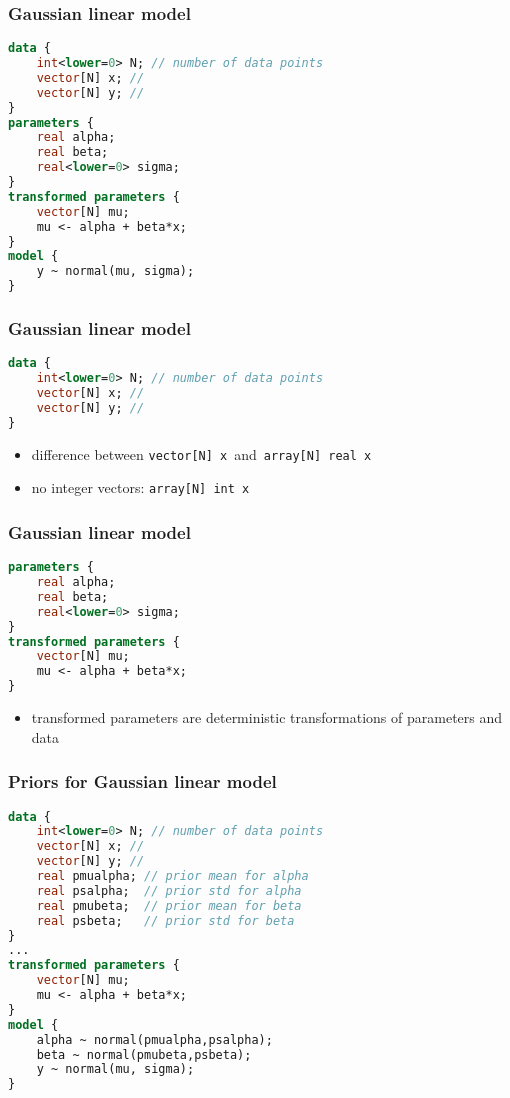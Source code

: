 \documentclass[finnish,english,t]{beamer}
\begin{document}
\begin{frame}[fragile]
  \frametitle{Gaussian linear model}
  {\small
  \begin{lstlisting}[language=Stan]
data {
    int<lower=0> N; // number of data points 
    vector[N] x; // 
    vector[N] y; // 
}
parameters {
    real alpha; 
    real beta; 
    real<lower=0> sigma;
}
transformed parameters {
    vector[N] mu;
    mu <- alpha + beta*x;
}
model {
    y ~ normal(mu, sigma);
}
  \end{lstlisting}
}
\end{frame} 

\begin{frame}[fragile]
  \frametitle{Gaussian linear model}
  {\small
  \begin{lstlisting}[language=Stan]
data {
    int<lower=0> N; // number of data points 
    vector[N] x; // 
    vector[N] y; // 
}
\end{lstlisting}
  }

  \begin{itemize}
  \item difference between {\small\tt vector[N] x}\, and\, {\small\tt array[N] real x}
  \item<2-> no integer vectors: {\small\tt array[N] int x}
  \end{itemize}
\end{frame}

\begin{frame}[fragile]
  \frametitle{Gaussian linear model}
  {\small
  \begin{lstlisting}[language=Stan]
parameters {
    real alpha; 
    real beta; 
    real<lower=0> sigma;
}
transformed parameters {
    vector[N] mu;
    mu <- alpha + beta*x;
}
\end{lstlisting}
  }
  \begin{itemize}
  \item transformed parameters are deterministic transformations of parameters and data
  \end{itemize}
\end{frame} 

\begin{frame}[fragile]
  \frametitle{Priors for Gaussian linear model}
  {\small
  \begin{lstlisting}[language=Stan]
data {
    int<lower=0> N; // number of data points 
    vector[N] x; // 
    vector[N] y; // 
    real pmualpha; // prior mean for alpha
    real psalpha;  // prior std for alpha
    real pmubeta;  // prior mean for beta
    real psbeta;   // prior std for beta
}
...
transformed parameters {
    vector[N] mu;
    mu <- alpha + beta*x;
}
model {
    alpha ~ normal(pmualpha,psalpha);
    beta ~ normal(pmubeta,psbeta);
    y ~ normal(mu, sigma);
}
  \end{lstlisting}
}
\end{frame} 
\end{document}
